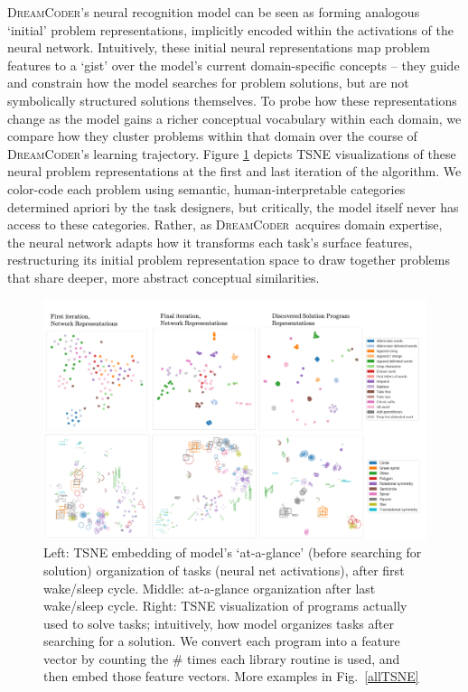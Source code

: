 \documentclass{article}
\newcommand{\system}{\textsc{DreamCoder}~}
\newcommand{\systemEnding}{\textsc{DreamCoder}}
\begin{document}
\systemEnding's neural recognition model can be seen as forming analogous `initial' problem representations, implicitly encoded within the activations of the neural network. Intuitively, these initial neural representations map problem features to a `gist' over the model’s current domain-specific concepts -- they guide and constrain how the model searches for problem solutions, but are not symbolically structured solutions themselves. To probe how these representations change as the model gains a richer conceptual vocabulary within each domain, we compare how they cluster problems within that domain over the course of \systemEnding's learning trajectory. Figure \ref{textExpertiseCluster} depicts TSNE visualizations of these neural problem representations at the first and last iteration of the algorithm. We color-code each problem using semantic, human-interpretable categories determined apriori by the task designers, but critically, the model itself never has access to these categories. Rather, as \system acquires domain expertise, the neural network adapts how it transforms each task's surface features, restructuring its initial problem representation space to draw together problems that share deeper, more abstract conceptual similarities.

\begin{figure}
  \includegraphics[width = \textwidth]{figures/textLogo_tsne.png}
  \caption{Left: TSNE embedding of model's `at-a-glance' (before searching for solution) organization of tasks (neural net activations), after first wake/sleep cycle. Middle: at-a-glance organization after last wake/sleep cycle. Right: TSNE visualization of programs actually used to solve tasks; intuitively, how model organizes tasks after searching for a solution. We convert each program into a feature vector by counting the \# times each library routine is used, and then embed those feature vectors. More examples in Fig.~\ref{allTSNE}}\label{textExpertiseCluster}
\end{figure}
\end{document}
